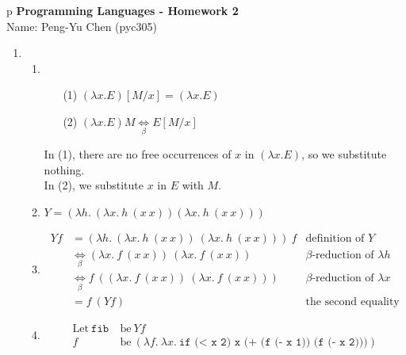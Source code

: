 \documentclass[a4paper,11pt]{article} %
\newcommand{\code}[1]{\texttt{#1}}
\begin{document}
\thispagestyle{empty}

\begin{tabular}{p\linewidth}
{\large \bf Programming Languages - Homework 2} \\ Name: Peng-Yu Chen (pyc305) \\
\hline
\end{tabular}

\vspace{0.4cm}

\begin{enumerate}
  \item %
  \begin{enumerate}
    \item %
    \begin{enumerate}
      \item [(1)] $(\lambda x.E) [M/x] = (\lambda x.E)$
      \item [(2)] $(\lambda x.E) M \underset{\beta}{\Leftrightarrow} E[M/x]$
    \end{enumerate}

    In (1), there are no free occurrences of $x$ in $(\lambda x. E)$, so we
    substitute nothing. \\
    In (2), we substitute $x$ in $E$ with $M$.

    \item %
          $Y = (\lambda h.~
            (\lambda x.~h~(x~x))
            (\lambda x.~h~(x~x))
          )$

    \item %
    \begin{align*}
      Yf &=(\lambda h.~ (\lambda x.~h~(x~x))~(\lambda x.~h~(x~x)))~f
         &\text{definition of $Y$} \\
         &\underset{\beta}{\Leftrightarrow}
          (\lambda x.~f~(x~x))~(\lambda x.~f~(x~x))
         &\text{$\beta$-reduction of $\lambda h$} \\
         &\underset{\beta}{\Leftrightarrow}
          f~((\lambda x.~f~(x~x))~(\lambda x.~f~(x~x)))
         &\text{$\beta$-reduction of $\lambda x$} \\
         &= f~(Yf) &\text{the second equality}
    \end{align*}

    \item %
    \begin{align*}
    \text{Let}~
      \code{fib}~&\text{be}~Yf \\
               f~&\text{be}~(\lambda f.~\lambda x.~\code{if (< x 2) x (+ (f (- x 1)) (f (- x 2)))})
    \end{align*}


\end{enumerate}
\end{enumerate}
\end{document}
